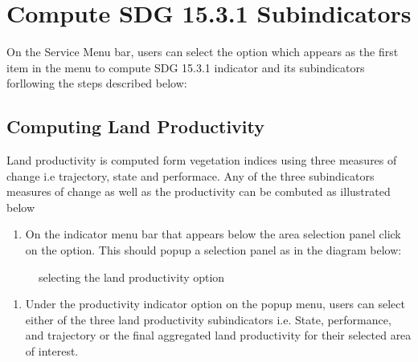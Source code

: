 \documentclass[letterpaper,10pt,english]{sphinxmanual}
\let\sphinxpxdimen\pdfpxdimen\else\newdimen\sphinxpxdimen
\begin{document}
\section{Compute SDG 15.3.1 Sub\sphinxhyphen{}indicators}
\label{\detokenize{Service/Calculate_SDG:compute-sdg-15-3-1-sub-indicators}}
\sphinxAtStartPar
On the Service Menu bar, users can select the  option which appears as the first item in the menu to compute SDG 15.3.1 indicator and its sub\sphinxhyphen{}indicators forllowing the steps described below:


\subsection{Computing Land Productivity}
\label{\detokenize{Service/Calculate_SDG:computing-land-productivity}}
\sphinxAtStartPar
Land productivity is computed form vegetation indices using three measures of change i.e trajectory, state and performace. Any of the three sub\sphinxhyphen{}indicators measures of change as well as the productivity can be combuted as illustrated below
\begin{enumerate}
%
\item {} 
\sphinxAtStartPar
On the indicator menu bar that appears below the area selection panel click on the  option. This should pop\sphinxhyphen{}up a selection panel as in the diagram below:

\end{enumerate}

\begin{figure}[H]
\centering
\capstart

\noindent\sphinxincludegraphics[width=697\sphinxpxdimen,height=482\sphinxpxdimen]{{productivity1}.png}
\caption{selecting the land productivity option}\label{\detokenize{Service/Calculate_SDG:id1}}\end{figure}
\begin{enumerate}
%
\setcounter{enumi}{1}
\item {} 
\sphinxAtStartPar
Under the productivity indicator option on the pop\sphinxhyphen{}up menu, users can select either of the three land productivity sub\sphinxhyphen{}indicators i.e. State, performance, and trajectory or the final aggregated land productivity for their selected area of interest.

\end{enumerate}
\end{document}
